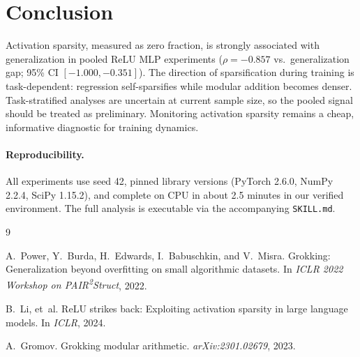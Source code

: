 \documentclass[11pt,a4paper]{article}
\begin{document}
\section{Conclusion}

Activation sparsity, measured as zero fraction, is strongly associated
with generalization in pooled ReLU MLP experiments ($\rho = -0.857$ vs.\
generalization gap; 95\% CI $[-1.000, -0.351]$). The direction of
sparsification during training is task-dependent: regression
self-sparsifies while modular addition becomes denser. Task-stratified
analyses are uncertain at current sample size, so the pooled signal should
be treated as preliminary. Monitoring activation sparsity remains a cheap,
informative diagnostic for training dynamics.

\paragraph{Reproducibility.}
All experiments use seed 42, pinned library versions (PyTorch 2.6.0,
NumPy 2.2.4, SciPy 1.15.2), and complete on CPU in about 2.5 minutes in
our verified environment.
The full analysis is executable via the accompanying \texttt{SKILL.md}.


\begin{thebibliography}{9}

A.~Power, Y.~Burda, H.~Edwards, I.~Babuschkin, and V.~Misra.
\newblock Grokking: Generalization beyond overfitting on small algorithmic
  datasets.
\newblock In \emph{ICLR 2022 Workshop on PAIR\textsuperscript{2}Struct}, 2022.

B.~Li, et~al.
\newblock ReLU strikes back: Exploiting activation sparsity in large language
  models.
\newblock In \emph{ICLR}, 2024.

A.~Gromov.
\newblock Grokking modular arithmetic.
\newblock \emph{arXiv:2301.02679}, 2023.

\end{thebibliography}
\end{document}
